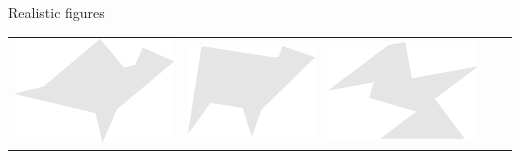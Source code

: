 \documentclass[14pt]{beamer}
\begin{document}
\begin{frame}{Realistic figures}
\begin{center}
{\begin{tabular}{ccccc}
                \includegraphics[scale=0.21]{figures/figure026w.pdf} &
                \;\;\;\;\includegraphics[scale=0.21]{figures/figure026y.pdf} &
                \includegraphics[scale=0.21]{figures/figure026z.pdf} &

\end{tabular}}
\end{center}
\end{frame}
\end{document}
